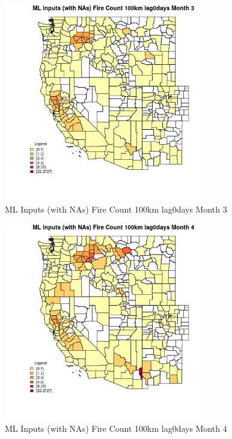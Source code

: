\begin{figure} 
\centering  
\includegraphics[width=0.77\textwidth]{Code_Outputs/Report_ML_input_PM25_Step4_part_f_de_duplicated_aves_prioritize_24hr_obswNAs_CountyFire_Count_100km_lag0daysmedianMonth3.jpg} 
\caption{\label{fig:Report_ML_input_PM25_Step4_part_f_de_duplicated_aves_prioritize_24hr_obswNAsCountyFire_Count_100km_lag0daysmedianMonth3}ML Inputs (with NAs) Fire Count 100km lag0days Month 3} 
\end{figure} 
 

\begin{figure} 
\centering  
\includegraphics[width=0.77\textwidth]{Code_Outputs/Report_ML_input_PM25_Step4_part_f_de_duplicated_aves_prioritize_24hr_obswNAs_CountyFire_Count_100km_lag0daysmedianMonth4.jpg} 
\caption{\label{fig:Report_ML_input_PM25_Step4_part_f_de_duplicated_aves_prioritize_24hr_obswNAsCountyFire_Count_100km_lag0daysmedianMonth4}ML Inputs (with NAs) Fire Count 100km lag0days Month 4} 
\end{figure} 
 

